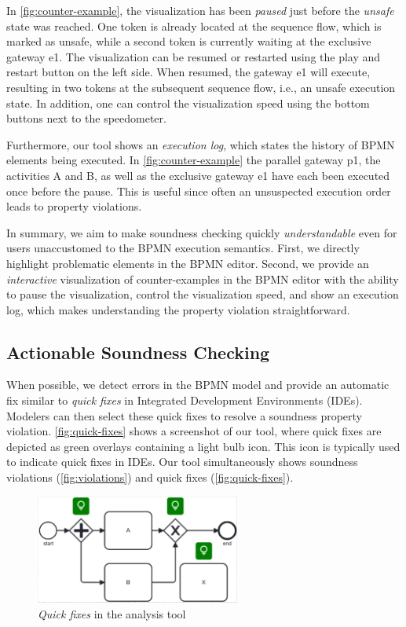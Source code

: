 \documentclass[runningheads]{llncs}
\begin{document}
In \autoref{fig:counter-example}, the visualization has been \textit{paused} just before the \textit{unsafe} state was reached.
One token is already located at the sequence flow, which is marked as unsafe, while a second token is currently waiting at the exclusive gateway \textsf{e1}.
The visualization can be resumed or restarted using the play and restart button on the left side.
When resumed, the gateway \textsf{e1} will execute, resulting in two tokens at the subsequent sequence flow, i.e., an unsafe execution state.
In addition, one can control the visualization speed using the bottom buttons next to the speedometer.

Furthermore, our tool shows an \textit{execution log}, which states the history of BPMN elements being executed.
In \autoref{fig:counter-example} the parallel gateway \textsf{p1}, the activities \textsf{A} and \textsf{B}, as well as the exclusive gateway \textsf{e1} have each been executed once before the pause.
This is useful since often an unsuspected execution order leads to property violations.

In summary, we aim to make soundness checking quickly \textit{understandable} even for users unaccustomed to the BPMN execution semantics.
First, we directly highlight problematic elements in the BPMN editor.
Second, we provide an \textit{interactive} visualization of counter-examples in the BPMN editor with the ability to pause the visualization, control the visualization speed, and show an execution log, which makes understanding the property violation straightforward.

\subsection{Actionable Soundness Checking}

When possible, we detect errors in the BPMN model and provide an automatic fix similar to \textit{quick fixes} in Integrated Development Environments (IDEs).
Modelers can then select these quick fixes to resolve a soundness property violation.
\autoref{fig:quick-fixes} shows a screenshot of our tool, where quick fixes are depicted as green overlays containing a light bulb icon.
This icon is typically used to indicate quick fixes in IDEs.
Our tool simultaneously shows soundness violations (\autoref{fig:violations}) and quick fixes (\autoref{fig:quick-fixes}).

\begin{figure}[ht]
	\centering
	\includegraphics[width=0.6\textwidth]{images/quickfixes}
	\caption{\textit{Quick fixes} in the analysis tool}
	\label{fig:quick-fixes}
\end{figure}
\end{document}
